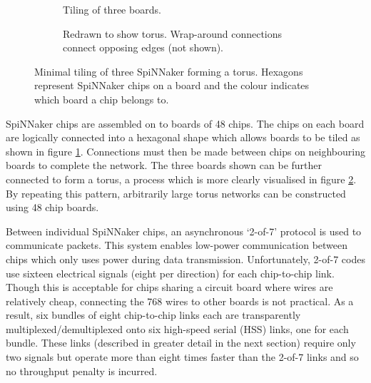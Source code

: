 			\begin{figure}
				\begin{subfigure}[b]{0.49\textwidth}
					\center
					
					
					\caption{Tiling of three boards.\color{white}{\\~}}
					\label{fig:threeboard}
				\end{subfigure}
				\begin{subfigure}[b]{0.49\textwidth}
					\center
					
					\vspace{0.5cm}
					
					\caption{Redrawn to show torus. Wrap-around connections connect
					opposing edges (not shown).}
					\label{fig:threeboard-sliced}
				\end{subfigure}
				
				\caption[Minimal tiling of three SpiNNaker forming a torus.]{Minimal
				tiling of three SpiNNaker forming a torus. Hexagons represent SpiNNaker
				chips on a board and the colour indicates which board a chip belongs
				to.}
				\label{fig:spinnaker-tiling}
			\end{figure}
			
			SpiNNaker chips are assembled on to boards of 48 chips. The chips on each
			board are logically connected into a hexagonal shape which allows boards
			to be tiled as shown in figure \ref{fig:threeboard}. Connections must then
			be made between chips on neighbouring boards to complete the network. The
			three boards shown can be further connected to form a torus, a process
			which is more clearly visualised in figure \ref{fig:threeboard-sliced}. By
			repeating this pattern, arbitrarily large torus networks can be
			constructed using 48 chip boards.
			
			Between individual SpiNNaker chips, an asynchronous `2-of-7' protocol is
			used to communicate packets. This system enables low-power communication
			between chips which only uses power during data transmission.
			Unfortunately, 2-of-7 codes use sixteen electrical signals (eight per
			direction) for each chip-to-chip link. Though this is acceptable for chips
			sharing a circuit board where wires are relatively cheap, connecting the
			768 wires to other boards is not practical. As a result, six bundles of
			eight chip-to-chip links each are transparently multiplexed/demultiplexed
			onto six high-speed serial (HSS) links, one for each bundle. These links
			(described in greater detail in the next section) require only two signals
			but operate more than eight times faster than the 2-of-7 links and so no
			throughput penalty is incurred.
			

